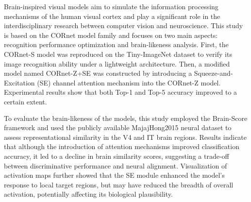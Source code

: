 \begin{abstracten}

Brain-inspired visual models aim to simulate the information processing mechanisms of the human visual cortex and play a significant role in the interdisciplinary research between computer vision and neuroscience. This study is based on the CORnet model family and focuses on two main aspects: recognition performance optimization and brain-likeness analysis. First, the CORnet-S model was reproduced on the Tiny-ImageNet dataset to verify its image recognition ability under a lightweight architecture. Then, a modified model named CORnet-Z+SE was constructed by introducing a Squeeze-and-Excitation (SE) channel attention mechanism into the CORnet-Z model. Experimental results show that both Top-1 and Top-5 accuracy improved to a certain extent.

To evaluate the brain-likeness of the models, this study employed the Brain-Score framework and used the publicly available MajajHong2015 neural dataset to assess representational similarity in the V4 and IT brain regions. Results indicate that although the introduction of attention mechanisms improved classification accuracy, it led to a decline in brain similarity scores, suggesting a trade-off between discriminative performance and neural alignment. Visualization of activation maps further showed that the SE module enhanced the model’s response to local target regions, but may have reduced the breadth of overall activation, potentially affecting its biological plausibility.

\end{abstracten}
